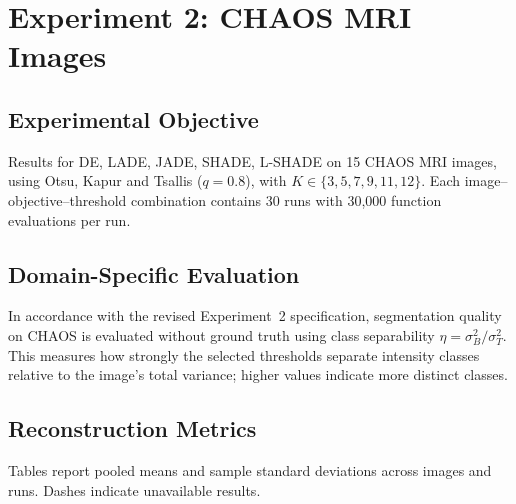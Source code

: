 \documentclass[review]{elsarticle}
\begin{document}
\section{Experiment 2: CHAOS MRI Images}

\label{sec:experiment2}

\subsection{Experimental Objective}

Results for DE, LADE, JADE, SHADE, L-SHADE on 15 CHAOS MRI images, using Otsu, Kapur and Tsallis ($q=0.8$), with $K\in\{3,5,7,9,11,12\}$. Each image--objective--threshold combination contains 30 runs with 30,000 function evaluations per run.

\subsection{Domain-Specific Evaluation}

In accordance with the revised Experiment~2 specification, segmentation
quality on CHAOS is evaluated without ground truth using class separability
$\eta=\sigma_B^2/\sigma_T^2$. This measures how strongly the selected
thresholds separate intensity classes relative to the image's total variance;
higher values indicate more distinct classes.

\subsection{Reconstruction Metrics}

Tables report pooled means and sample standard deviations across images and runs. Dashes indicate unavailable results.
\end{document}
